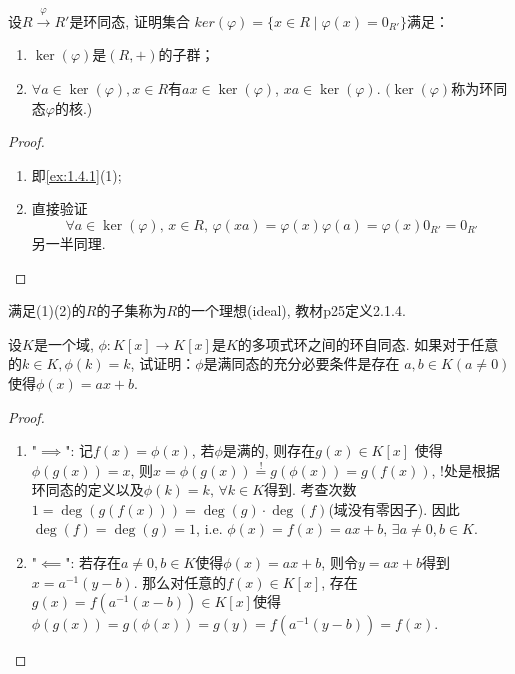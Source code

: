 \begin{problem}
    设$R \overset{\varphi}\to R'$是环同态, 证明集合
$ker(\varphi) = \{x \in R \mid \varphi(x) = 0_{R'}\}$满足：
\begin{enumerate}[(1)]
    \item $\ker(\varphi)$是$(R, +)$的子群；
    \item $\forall a \in \ker (\varphi), x \in R$有$ax \in \ker(\varphi)$, $xa \in \ker (\varphi)$.
$(\ker(\varphi)$称为环同态$\varphi$的核.)
\end{enumerate}
\end{problem}

\begin{proof}
\begin{enumerate}[(1)]
    \item 即\ref{ex:1.4.1}(1);
    \item 直接验证\[
        \forall a \in \ker(\varphi),\, x \in R,\, \varphi(xa) = \varphi(x)\varphi(a) = \varphi(x)0_{R'} = 0_{R'}
    \]
    另一半同理.
\end{enumerate}
\end{proof}

\begin{remark}
    满足(1)(2)的$R$的子集称为$R$的一个理想(ideal), 教材p25定义2.1.4.
\end{remark}

\begin{problem}
    设$K$是一个域, $\phi:K[x] \to K[x]$是$K$的多项式环之间的环自同态. 
如果对于任意的$k \in K, \phi(k) = k$, 试证明：$\phi$是满同态的充分必要条件是存在
$a, b \in K(a \neq 0)$使得$\phi(x) = ax + b$.
\end{problem}

\begin{proof}
\begin{enumerate}[(1)]
    \item "$\implies$": 记$f(x) = \phi(x)$, 若$\phi$是满的, 则存在$g(x) \in K[x]$
使得$\phi(g(x)) = x$, 则$x = \phi(g(x)) \overset{!}= g(\phi(x)) = g(f(x))$,
!处是根据环同态的定义以及$\phi(k) = k,\, \forall k \in K$得到.
考查次数$1 = \deg(g(f(x))) = \deg(g) \cdot \deg(f)$(域没有零因子). 因此$\deg(f) = \deg(g) = 1$,
i.e. $\phi(x) = f(x) = ax + b,\, \exists a \neq 0, b \in K$.
    \item "$\impliedby$": 若存在$a \neq 0, b \in K$使得$\phi(x) = ax + b$,
则令$y = ax + b$得到$x = a^{-1}(y - b)$. 那么对任意的$f(x) \in K[x]$,
存在$g(x) = f(a^{-1}(x - b)) \in K[x]$使得$\phi(g(x)) = g(\phi(x)) = g(y) = f(a^{-1}(y - b)) = f(x)$.
\end{enumerate}
\end{proof}

